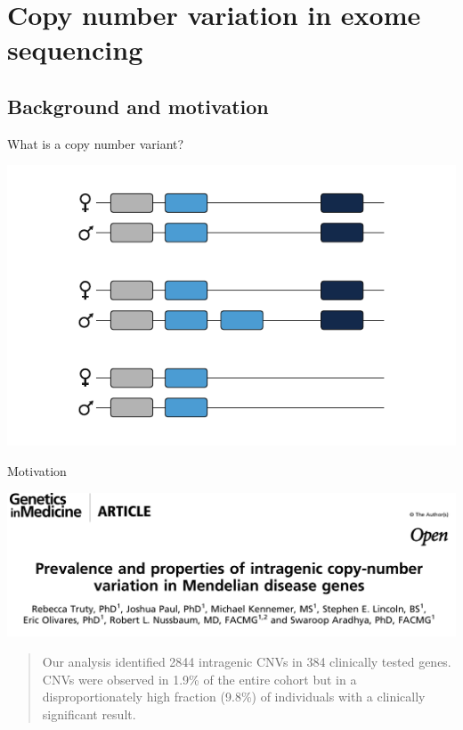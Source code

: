 \documentclass[
  10pt,
  ignorenonframetext,
  m]{beamer}
\begin{document}
\hypertarget{copy-number-variation-in-exome-sequencing}{%
\section{Copy number variation in exome
sequencing}\label{copy-number-variation-in-exome-sequencing}}

\hypertarget{background-and-motivation}{%
\subsection{Background and motivation}\label{background-and-motivation}}

\begin{frame}{What is a copy number variant?}
\protect\hypertarget{what-is-a-copy-number-variant}{}

\centering

\includegraphics{images/cnvExamples.pdf}

\end{frame}

\begin{frame}{Motivation}
\protect\hypertarget{motivation}{}

\centering

\includegraphics{images/truty.png}

\bigskip

\begin{quote}
Our analysis identified 2844 intragenic CNVs in 384 clinically tested
genes. CNVs were observed in 1.9\% of the entire cohort but in a
disproportionately high fraction (9.8\%) of individuals with a
clinically significant result.
\end{quote}

\end{frame}
\end{document}

